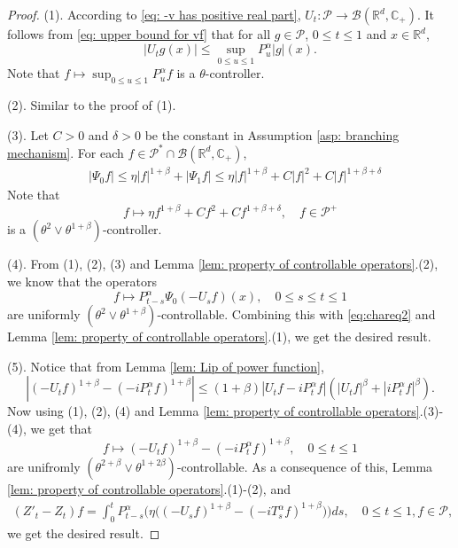 \documentclass[12pt,a4paper]{amsart}
\theoremstyle{plain}
\theoremstyle{definition}
\numberwithin{equation}{section}
\begin{document}
\begin{proof}
    (1). According to \eqref{eq: -v has positive real part}, $U_t: \mathcal P \to \mathcal B(\mathbb R^d, \mathbb C_+)$. 
    It follows from \eqref{eq: upper bound for vf} that for all $g\in \mathcal P$, $0\leq t\leq 1$ and $x\in \mathbb R^d$,
\[
    |U_t g(x)|
    \leq \sup_{0\leq u\leq 1}P_u^\alpha |g| (x).
\]
    Note that $f\mapsto\sup_{0\leq u\leq 1}P^{\alpha}_u f$ is a $\theta$-controller.

    (2). Similar to the proof of (1).

    (3). Let $C>0$ and $\delta > 0$ be the constant in Assumption \ref{asp: branching mechanism}. 
    For each $f\in \mathcal P^* \cap \mathcal B(\mathbb R^d, \mathbb C_+)$,
\begin{equation}\begin{split}
    &|\Psi_0 f| 
    \leq \eta |f|^{1+\beta} + |\Psi_1 f|
    \leq \eta |f|^{1+\beta} + C|f|^2+ C|f|^{1+\beta + \delta}
\end{split}\end{equation}
    Note that 
\[
    f \mapsto \eta f^{1+\beta} + Cf^2+ Cf^{1+\beta + \delta},\quad f\in \mathcal P^+
\]
     is a $(\theta^2 \vee \theta^{1+\beta})$-controller.

    (4). From (1), (2), (3) and Lemma \ref{lem: property of controllable operators}.(2), we know that the operators
\[
    f
    \mapsto P^\alpha_{t-s}\Psi_0(-U_sf)(x),
    \quad 0\leq s\leq t\leq 1
\]
    are uniformly $(\theta^2\vee \theta^{1+\beta})$-controllable.
    Combining this with \eqref{eq:chareq2} and Lemma \ref{lem: property of controllable operators}.(1), we get the desired result.

    (5). Notice that from Lemma \ref{lem: Lip of power function},
\[
    |(-U_t f)^{1+\beta} - (-iP^\alpha_t f)^{1+\beta} |
    \leq  (1+\beta) |U_t f-iP^\alpha_t f|(|U_t f|^{\beta}+|i P^\alpha_t f|^{\beta}).
\]
    Now using (1), (2), (4) and Lemma \ref{lem: property of controllable operators}.(3)-(4), we get that
\[
    f \mapsto (-U_t f)^{1+\beta} - (-iP^\alpha_t f)^{1+\beta},\quad 0\leq t\leq 1
\]
    are unifromly $(\theta^{2+\beta}\vee \theta^{1+2\beta})$-controllable.
    As a consequence of this, Lemma \ref{lem: property of controllable operators}.(1)-(2), and 
\begin{equation}\begin{split}
    (Z'_t - Z_t)f = \int_0^t P^\alpha_{t-s}\Big( \eta \big((-U_s f)^{1+\beta} - (-iT_s^\alpha f)^{1+\beta} \big)\Big)ds,
    \quad 0\leq t\leq 1, f\in \mathcal P,
\end{split}\end{equation}
    we get the desired result.


\end{proof}
\end{document}
